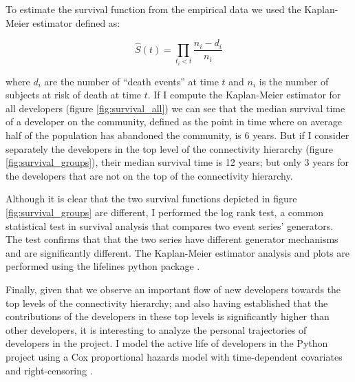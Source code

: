 To estimate the survival function from the empirical data we used the Kaplan-Meier estimator \citep{kaplan:1958} defined as:

$$
\hat{S}(t) = \prod_{t_i < t} \frac{n_i - d_i}{n_i}
$$

where $d_i$ are the number of ``death events'' at time $t$ and $n_i$ is the number of subjects at risk of death at time $t$. If I compute the Kaplan-Meier estimator for all developers (figure \ref{fig:survival_all}) we can see that the median survival time of a developer on the community, defined as the point in time where on average half of the population has abandoned the community, is 6 years. But if I consider separately the developers in the top level of the connectivity hierarchy (figure \ref{fig:survival_groups}), their median survival time is 12 years; but only 3 years for the developers that are not on the top of the connectivity hierarchy.

Although it is clear that the two survival functions depicted in figure \ref{fig:survival_groups} are different, I performed the log rank test, a common statistical test in survival analysis that compares two event series' generators. The test confirms that that the two series have different generator mechanisms and are significantly different. The Kaplan-Meier estimator analysis and plots are performed using the lifelines python package \citep{lifelines:2016}.

Finally, given that we observe an important flow of new developers towards the top levels of the connectivity hierarchy; and also having established that the contributions of the developers in these top levels is significantly higher than other developers, it is interesting to analyze the personal trajectories of developers in the project. I model the active life of developers in the Python project using a Cox proportional hazards model with time-dependent covariates and right-censoring \citep[appendix on survival analysis]{fox:2002}.


